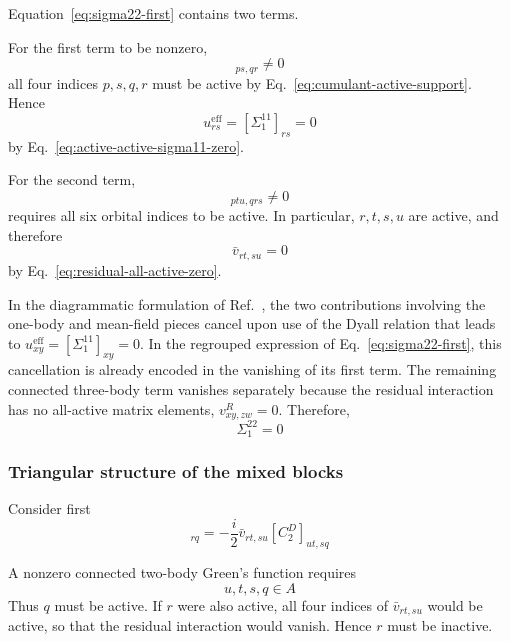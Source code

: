 \documentclass[aip,jcp,reprint,noshowkeys,superscriptaddress]{revtex4-1}
\begin{document}
Equation~\eqref{eq:sigma22-first} contains two terms.

For the first term to be nonzero,
\begin{equation}
  [C_2^D]_{ps,qr}
  \neq0
\end{equation}
all four indices $p,s,q,r$ must be active by
Eq.~\eqref{eq:cumulant-active-support}.  Hence
\begin{equation}
  u^{\mathrm{eff}}_{rs}
  =
  [\Sigma_1^{11}]_{rs}
  =
  0
\end{equation}
by Eq.~\eqref{eq:active-active-sigma11-zero}.

For the second term,
\begin{equation}
  [C_3^D]_{ptu,qrs}
  \neq0
\end{equation}
requires all six orbital indices to be active.  In particular,
$r,t,s,u$ are active, and therefore
\begin{equation}
  \bar v_{rt,su}=0
\end{equation}
by Eq.~\eqref{eq:residual-all-active-zero}.

In the diagrammatic formulation of Ref.~\cite{WangFangLi2026}, the two
contributions involving the one-body and mean-field pieces cancel upon use
of the Dyall relation that leads to
$u^{\mathrm{eff}}_{xy}=[\Sigma_1^{11}]_{xy}=0$.  In the regrouped expression
of Eq.~\eqref{eq:sigma22-first}, this cancellation is already encoded in the
vanishing of its first term.  The remaining connected three-body term
vanishes separately because the residual interaction has no all-active
matrix elements, $v^R_{xy,zw}=0$.  Therefore,
\begin{equation}
  \Sigma_1^{22}=0
  \label{eq:dyall-sigma22-zero}
\end{equation}


\subsubsection{Triangular structure of the mixed blocks}

Consider first
\begin{equation}
  [\Sigma_1^{12}]_{rq}
  =
  -\frac{i}{2}
  \bar v_{rt,su}
  [C_2^D]_{ut,sq}
\end{equation}

A nonzero connected two-body Green's function requires
\begin{equation}
  u,t,s,q\in A
\end{equation}
Thus $q$ must be active.  If $r$ were also active, all four indices of
$\bar v_{rt,su}$ would be active, so that the residual interaction
would vanish.  Hence $r$ must be inactive.
\end{document}
